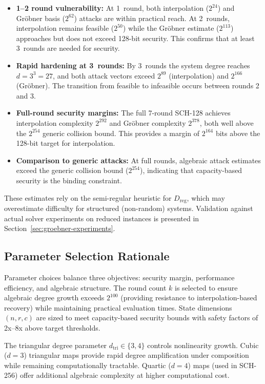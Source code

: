 ﻿\documentclass[english]{aucmcs}
\begin{document}
\begin{itemize}
  \item \textbf{1--2 round vulnerability:} At 1~round, both interpolation ($2^{24}$) and Gr\"obner basis ($2^{62}$) attacks are within practical reach. At 2~rounds, interpolation remains feasible ($2^{50}$) while the Gr\"obner estimate ($2^{113}$) approaches but does not exceed 128-bit security. This confirms that at least 3~rounds are needed for security.
  
  \item \textbf{Rapid hardening at 3~rounds:} By 3~rounds the system degree reaches $d = 3^3 = 27$, and both attack vectors exceed $2^{89}$ (interpolation) and $2^{166}$ (Gr\"obner). The transition from feasible to infeasible occurs between rounds 2 and 3.
  
  \item \textbf{Full-round security margins:} The full 7-round SCH-128 achieves interpolation complexity $2^{292}$ and Gr\"obner complexity $2^{378}$, both well above the $2^{254}$ generic collision bound. This provides a margin of $2^{164}$ bits above the 128-bit target for interpolation.
  
  \item \textbf{Comparison to generic attacks:} At full rounds, algebraic attack estimates exceed the generic collision bound ($2^{254}$), indicating that capacity-based security is the binding constraint.
\end{itemize}

These estimates rely on the semi-regular heuristic for $D_{\mathrm{reg}}$, which may overestimate difficulty for structured (non-random) systems. Validation against actual solver experiments on reduced instances is presented in Section~\ref{sec:groebner-experiments}.


\subsection{Parameter Selection Rationale}

Parameter choices balance three objectives: security margin, performance efficiency, and algebraic structure. The round count $k$ is selected to ensure algebraic degree growth exceeds $2^{100}$ (providing resistance to interpolation-based recovery) while maintaining practical evaluation times. State dimensions $(n, r, c)$ are sized to meet capacity-based security bounds with safety factors of 2x--8x above target thresholds.

The triangular degree parameter $d_{\text{tri}} \in \{3,4\}$ controls nonlinearity growth. Cubic ($d=3$) triangular maps provide rapid degree amplification under composition while remaining computationally tractable. Quartic ($d=4$) maps (used in SCH-256) offer additional algebraic complexity at higher computational cost.
\end{document}
